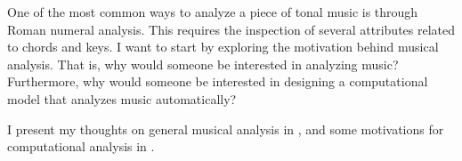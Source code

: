 

One of the most common ways to analyze a piece of tonal
music is through Roman numeral analysis. This requires the
inspection of several attributes related to chords and keys.
I want to start by exploring the motivation behind musical
analysis. That is, why would someone be interested in
analyzing music? Furthermore, why would someone be
interested in designing a computational model that analyzes
music automatically?

I present my thoughts on general musical analysis in , and some motivations for computational analysis in .
